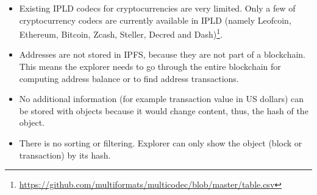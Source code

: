 \begin{itemize}
    \item Existing IPLD codecs for cryptocurrencies are very limited. Only a few of cryptocurrency codecs are currently available in IPLD (namely Leofcoin, Ethereum, Bitcoin, Zcash, Steller, Decred and Dash)\footnote{\url{https://github.com/multiformats/multicodec/blob/master/table.csv}}.
    \item Addresses are not stored in IPFS, because they are not part of a blockchain. This means the explorer needs to go through the entire blockchain for computing address balance or to find address transactions.
    \item No additional information (for example transaction value in US dollars) can be stored with objects because it would change content, thus, the hash of the object.
    \item There is no sorting or filtering. Explorer can only show the object (block or transaction) by its hash. 
\end{itemize}




